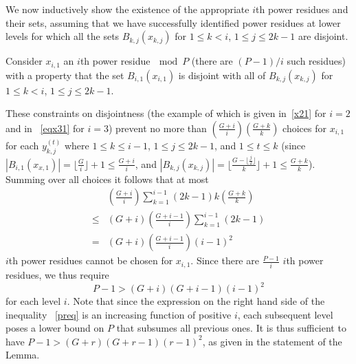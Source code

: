 \documentclass[12pt]{article} \pagestyle{plain} \topmargin
\begin{document}
We now inductively show the existence of the appropriate $i$th power
residues and their sets, assuming that we have successfully
identified power residues at lower levels for which all the sets
$B_{k,j}(x_{k,j})$ for $1 \leq k <i$, $1 \leq j \leq 2k-1$ are
disjoint.

Consider $x_{i,1}$ an $i$th power residue$~\mod P$ (there are
$(P-1)/i$ such  residues) with a property that the set
$B_{i,1}(x_{i,1})$ is disjoint with all of $B_{k,j}(x_{k,j})$ for
$1 \leq k <i$, $1 \leq j \leq 2k-1$.

These  constraints on disjointness (the example of which is given
in~\eqref{x21} for $i=2$ and in ~\eqref{eqx31} for $i=3$) prevent
no more than $(\frac{G+i}{i})(\frac{G+k}{k})$ choices for
$x_{i,1}$  for each $y_{k,j}^{(t)}$ where $1 \leq k \leq i-1$, $1
\leq j \leq 2k-1$, and $1 \leq t \leq k$ (since
$|B_{i,1}(x_{x,1})|=\lfloor \frac{G}{i} \rfloor+1 \leq
\frac{G+i}{i}$, and $|B_{k,j}(x_{k,j})|=\lfloor \frac{G-\lfloor
\frac{j}{2}\rfloor}{k} \rfloor+1 \leq \frac{G+k}{k}$). Summing
over all choices it follows that at most
\begin{equation}\begin{array}{lll}{}& \left(\frac{G+i}{i}\right) \sum_{k=1}^{i-1}
(2k-1)k\left(\frac{G+k}{k}\right)\\\leq&
(G+i)\left(\frac{G+i-1}{i}\right) \sum_{k=1}^{i-1}
(2k-1)\\=&(G+i)\left(\frac{G+i-1}{i}\right)(i-1)^2
\end{array}\end{equation} $i$th power residues cannot be chosen for
$x_{i,1}$. Since there are $\frac{P-1}{i}$ $i$th power residues,
we thus require
\begin{equation}\label{preq}
P-1 > (G+i)(G+i-1)(i-1)^2
\end{equation}
for each level $i$. Note that since the expression on the right
hand side of the inequality ~\eqref{preq} is an increasing
function of positive $i$, each subsequent level poses a lower
bound on $P$ that subsumes all previous ones. It is thus
sufficient to have $P-1
> (G+r)(G+r-1)(r-1)^2$, as given in the statement of the Lemma.
\end{document}
